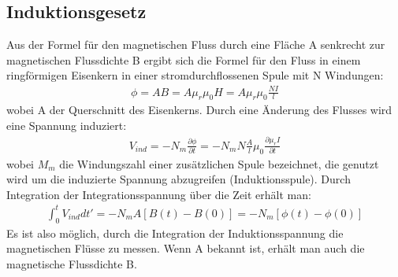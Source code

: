 \documentclass[a4paper,10pt]{scrartcl}
\begin{document}
		\newpage
		
	\subsection{Induktionsgesetz}
	
		Aus der Formel für den magnetischen Fluss durch eine Fläche A senkrecht zur magnetischen Flussdichte B ergibt sich die Formel für den Fluss in einem ringförmigen Eisenkern in einer stromdurchflossenen Spule mit N Windungen:
		\begin{align}
		\phi=AB=A\mu_{r}\mu_{0}H=A\mu_{r}\mu_{0}\frac{NI}{l}
		\end{align}
		wobei A der Querschnitt des Eisenkerns. Durch eine Änderung des Flusses wird eine Spannung induziert:
		\begin{align}
		V_{ind}=-N_{m}\frac{\partial \phi}{\partial t}=-N_{m}N\frac{A}{l}\mu_{0}\frac{\partial \mu_{r}I}{\partial t}
		\end{align}
		wobei \(M_{m}\) die Windungszahl einer zusätzlichen Spule bezeichnet, die genutzt wird um die induzierte Spannung abzugreifen (Induktionsspule). Durch Integration der Integrationsspannung über die Zeit erhält man:
		\begin{align}
		\int_{0}^{t}V_{ind}dt'=-N_{m}A[B(t)-B(0)]=-N_{m}[\phi(t)-\phi(0)]
		\end{align}
		Es ist also möglich, durch die Integration der Induktionsspannung die magnetischen Flüsse zu messen. Wenn A bekannt ist, erhält man auch die magnetische Flussdichte B.
	
		
		
	
\end{document}
